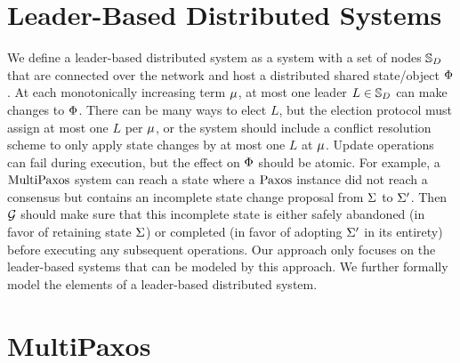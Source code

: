 \section{Leader-Based Distributed Systems}
\label{chapter:witnesspassing:sec:leader-based-distributed-systems}


We define a leader-based distributed system as a system with a set of nodes
$\mathbb{S}_{D}$ that are connected over the network and host a distributed shared state/object
$\Phi$. At each monotonically increasing term $\mu$, at most one leader
$L \in \mathbb{S}_{D}$ can make changes to $\Phi$. There can be many ways to elect
$L$, but the election protocol must assign at most one $L$ per $\mu$,
or the system should include a conflict resolution scheme to only apply
state changes by at most one $L$ at $\mu$.
Update operations can fail during execution, but the effect on $\Phi$ should be atomic. 
For example, a $\mathrm{MultiPaxos}$ system can reach a
state where a $\mathrm{Paxos}$ instance did not reach a consensus but contains an
incomplete state change proposal from $\Sigma$ to $\Sigma^\prime$.
Then $\mathcal{G}$ should make sure that this incomplete state is either safely abandoned (in favor of retaining state $\Sigma$)
or completed (in favor of adopting $\Sigma^\prime$ in its entirety)
before executing any subsequent operations. 
Our approach only focuses on the leader-based systems that can be modeled by this approach.
We further formally model the elements of a leader-based distributed system.


\section{MultiPaxos}
\label{chapter:witnesspassing:multipaxos}


